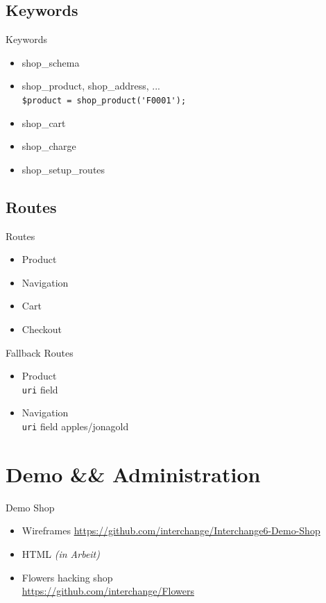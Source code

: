 \subsection{Keywords}
\begin{frame}[fragile]{Keywords}
\begin{itemize}
\item shop\_schema
\item shop\_product, shop\_address, ...\\
\verb|$product = shop_product('F0001');|
\item shop\_cart
\item shop\_charge
\item shop\_setup\_routes
\end{itemize}
\end{frame}

\subsection{Routes}
\begin{frame}{Routes}
\begin{itemize}
\item Product
\item Navigation
\item Cart
\item Checkout
\end{itemize}
\end{frame}

\begin{frame}[fragile]{Fallback Routes}
\begin{itemize}
\item Product\\
\verb|uri| field
\item Navigation\\
\verb|uri| field
apples/jonagold
\end{itemize}
\end{frame}

\section{Demo \&\& Administration}
\begin{frame}{Demo Shop}
\begin{itemize}
\item Wireframes
  \url{https://github.com/interchange/Interchange6-Demo-Shop}
\item HTML \textit{(in Arbeit)}
\item Flowers hacking shop \\
  \url{https://github.com/interchange/Flowers}
\end{itemize}
\end{frame}

